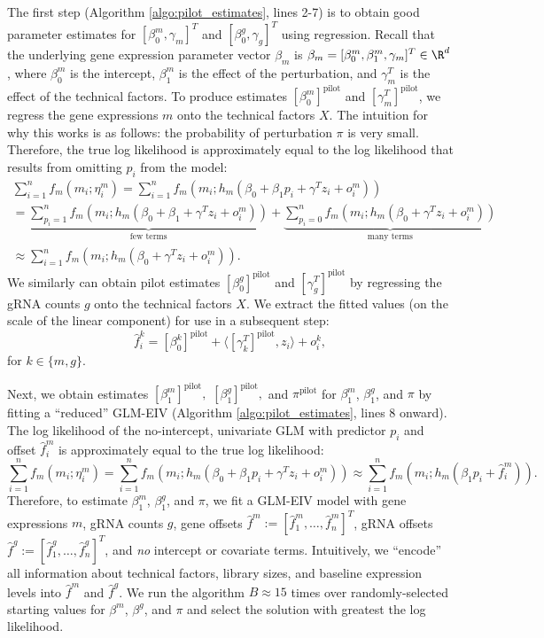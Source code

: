\documentclass[12pt]{article}
\begin{document}
The first step (Algorithm \ref{algo:pilot_estimates}, lines 2-7) is to obtain good parameter estimates for $[\beta^m_0, \gamma_m]^T$ and $[\beta^g_0, \gamma_g]^T$ using regression. Recall that the underlying gene expression parameter vector $\beta_m$ is $\beta_m = [\beta^m_0, \beta^m_1, \gamma_m]^T \in \R^d$, where $\beta^m_0$ is the intercept, $\beta^m_1$ is the effect of the perturbation, and $\gamma_m^T$ is the effect of the technical factors. To produce estimates $[\beta^m_0]^\textrm{pilot}$ and $[\gamma_m^T]^\textrm{pilot}$, we regress the gene expressions $m$ onto the technical factors $X$. The intuition for why this works is as follows: the probability of perturbation $\pi$ is very small. Therefore, the true log likelihood is approximately equal to the log likelihood that results from omitting $p_i$ from the model:
\begin{multline*}
\sum_{i=1}^n f_m(m_i; \eta^m_i) = \sum_{i=1}^n f_m(m_i; h_m(\beta_0 + \beta_1 p_i + \gamma^T z_i + o^m_i)) \\ = \underbrace{\sum_{p_i =1}^n f_m(m_i; h_m(\beta_0 + \beta_1 + \gamma^T z_i + o^m_i))}_\textrm{few terms}  + \underbrace{\sum_{p_i = 0}^n f_m(m_i; h_m(\beta_0 + \gamma^T z_i + o^m_i))}_\textrm{many terms} \\ \approx \sum_{i = 1}^n f_m(m_i; h_m(\beta_0 + \gamma^T z_i + o^m_i)).
\end{multline*}
We similarly can obtain pilot estimates $[\beta^g_0]^\textrm{pilot}$ and $[\gamma^T_g]^\textrm{pilot}$ by regressing the gRNA counts $g$ onto the technical factors $X$. We extract the fitted values (on the scale of the linear component) for use in a subsequent step: $$\hat{f}^k_i = [\beta^k_0]^\textrm{pilot} + \langle [\gamma^T_k]^\textrm{pilot}, z_i \rangle + o^k_i,$$
for $k \in \{m,g\}.$

Next, we obtain estimates $[\beta_1^m]^\textrm{pilot},$ $[\beta_1^g]^\textrm{pilot},$ and $\pi^\textrm{pilot}$ for $\beta^m_1$, $\beta^g_1$, and $\pi$ by fitting a ``reduced'' GLM-EIV (Algorithm \ref{algo:pilot_estimates}, lines 8 onward). The log likelihood of the no-intercept, univariate GLM with predictor $p_i$ and offset $\hat{f}^m_i$ is approximately equal to the true log likelihood:
$$ \sum_{i=1}^n f_m(m_i; \eta^m_i) =
\sum_{i=1}^n f_m(m_i; h_m(\beta_0 + \beta_1 p_i + \gamma^T z_i + o^m_i)) \approx \sum_{i=1}^n f_m(m_i; h_m( \beta_1 p_i + \hat{f}^m_i)).
$$
Therefore, to estimate $\beta^m_1$, $\beta^g_1$, and $\pi$, we fit a GLM-EIV model with gene expressions $m$, gRNA counts $g$, gene offsets $\hat{f}^m := [\hat{f}^m_1, \dots, \hat{f}^m_n]^T$, gRNA offsets $\hat{f}^g := [\hat{f}^g_1, \dots, \hat{f}^g_n]^T$, and \textit{no} intercept or covariate terms. Intuitively, we ``encode'' all information about technical factors, library sizes, and baseline expression levels into $\hat{f}^m$ and $\hat{f}^g$. We run the algorithm $B \approx 15$ times over randomly-selected starting values for $\beta^m$, $\beta^g$, and $\pi$ and select the solution with greatest the log likelihood.
\end{document}
